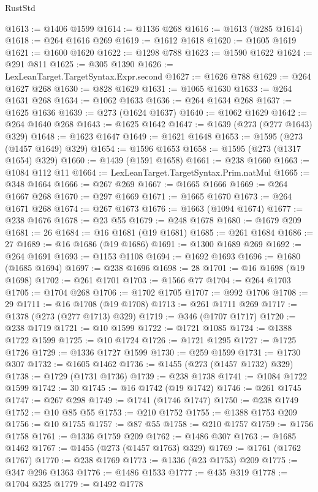 \begin{lexlean}{RustStd}
\begin{coremodule}
{{{{{{{{{{{{{{{{{{{@1613 := @1406 @1599
@1614 := @1136 @268
@1616 := @1613 (@285 @1614)
@1618 := @264 @1616 @269
@1619 := @1612 @1618
@1620 := @1605 @1619
@1621 := @1600 @1620
@1622 := @1298 @788
@1623 := @1590 @1622
@1624 := @291 @811
@1625 := @305 @1390
@1626 := LexLeanTarget.TargetSyntax.Expr.second
@1627 := @1626 @788
@1629 := @264 @1627 @268
@1630 := @828 @1629
@1631 := @1065 @1630
@1633 := @264 @1631 @268
@1634 := @1062 @1633
@1636 := @264 @1634 @268
@1637 := @1625 @1636
@1639 := @273 (@1624 @1637)
@1640 := @1062 @1629
@1642 := @264 @1640 @268
@1643 := @1625 @1642
@1647 := @1639 (@273 (@277 @1643) @329)
@1648 := @1623 @1647
@1649 := @1621 @1648
@1653 := @1595 (@273 (@1457 @1649) @329)
@1654 := @1596 @1653
@1658 := @1595 (@273 (@1317 @1654) @329)
@1660 := @1439 (@1591 @1658)
@1661 := @238 @1660
@1663 := @1084 @112 @11
@1664 := LexLeanTarget.TargetSyntax.Prim.natMul
@1665 := @348 @1664
@1666 := @267 @269
@1667 := @1665 @1666
@1669 := @264 @1667 @268
@1670 := @297 @1669
@1671 := @1665 @1670
@1673 := @264 @1671 @268
@1674 := @267 @1673
@1676 := @1663 (@1094 @1674)
@1677 := @238 @1676
@1678 := @23 @55
@1679 := @248 @1678
@1680 := @1679 @209
@1681 := 26
@1684 := @16 @1681 (@19 @1681)
@1685 := @261 @1684
@1686 := 27
@1689 := @16 @1686 (@19 @1686)
@1691 := @1300 @1689 @269
@1692 := @264 @1691
@1693 := @1153 @1108
@1694 := @1692 @1693
@1696 := @1680 (@1685 @1694)
@1697 := @238 @1696
@1698 := 28
@1701 := @16 @1698 (@19 @1698)
@1702 := @261 @1701
@1703 := @1566 @77
@1704 := @264 @1703
@1705 := @1704 @268
@1706 := @1702 @1705
@1707 := @992 @1706
@1708 := 29
@1711 := @16 @1708 (@19 @1708)
@1713 := @261 @1711 @269
@1717 := @1378 (@273 (@277 @1713) @329)
@1719 := @346 (@1707 @1717)
@1720 := @238 @1719
@1721 := @10 @1599
@1722 := @1721 @1085
@1724 := @1388 @1722 @1599
@1725 := @10 @1724
@1726 := @1721 @1295
@1727 := @1725 @1726
@1729 := @1336 @1727 @1599
@1730 := @259 @1599
@1731 := @1730 @307
@1732 := @1605 @1462
@1736 := @1455 (@273 (@1457 @1732) @329)
@1738 := @1729 (@1731 @1736)
@1739 := @238 @1738
@1741 := @1084 @1722 @1599
@1742 := 30
@1745 := @16 @1742 (@19 @1742)
@1746 := @261 @1745
@1747 := @267 @298
@1749 := @1741 (@1746 @1747)
@1750 := @238 @1749
@1752 := @10 @85 @55
@1753 := @210 @1752
@1755 := @1388 @1753 @209
@1756 := @10 @1755
@1757 := @87 @55
@1758 := @210 @1757
@1759 := @1756 @1758
@1761 := @1336 @1759 @209
@1762 := @1486 @307
@1763 := @1685 @1462
@1767 := @1455 (@273 (@1457 @1763) @329)
@1769 := @1761 (@1762 @1767)
@1770 := @238 @1769
@1773 := @1336 (@23 @1753) @209
@1775 := @347 @296 @1363
@1776 := @1486 @1533
@1777 := @435 @319
@1778 := @1704 @325
@1779 := @1492 @1778
}}}}}}}}}}}}}}}}}}}
\end{coremodule}
\end{lexlean}
